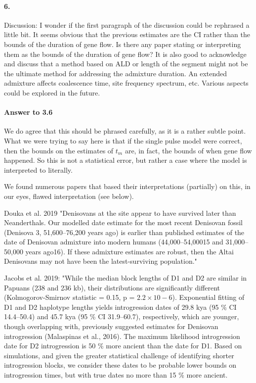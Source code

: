 \documentclass[11pt]{article}
\let\oldparagraph\paragraph
\renewcommand{\paragraph}[1]{\oldparagraph{#1}\mbox{}}
\begin{document}
\paragraph{6.} 
Discussion: I wonder if the first paragraph of the discussion could be rephrased a little bit. It seems obvious that the previous estimates are the CI rather than the bounds of the duration of gene flow. Is there any paper stating or interpreting them as the bounds of the duration of gene flow? It is also good to acknowledge and discuss that a method based on ALD or length of the segment might not be the ultimate method for addressing the admixture duration. An extended admixture affects coalescence time, site frequency spectrum, etc. Various aspects could be explored in the future.

\paragraph{Answer to 3.6}
We do agree that this should be phrased carefully, as it is a rather subtle point. What we were trying to say here is that if the single pulse model were correct, then the bounds on the estimates of $t_m$ are, in fact,  the bounds of when gene flow happened. So this is not a statistical error, but rather a case where the model is interpreted to literally. 

We found numerous papers that based their interpretations (partially) on this, in our eyes, flawed interpretation (see below).

Douka et al. 2019 "Denisovans at the site appear to have survived later than Neanderthals. Our modelled date estimate for the most recent Denisovan fossil (Denisova 3, 51,600–76,200 years ago) is earlier than published estimates of the date of Denisovan admixture into modern humans (44,000–54,00015 and 31,000–50,000 years ago16). If these admixture estimates are robust, then the Altai Denisovans may not have been the latest-surviving population."

Jacobs et al. 2019: "While the median block lengths of D1 and D2 are similar in Papuans (238 and 236 kb), their distributions are significantly different (Kolmogorov-Smirnov statistic = 0.15, p = $2.2 \times 10−6$). Exponential fitting of D1 and D2 haplotype lengths yields introgression dates of 29.8 kya (95 \% CI 14.4–50.4) and 45.7 kya (95 \% CI 31.9–60.7), respectively, which are younger, though overlapping with, previously suggested estimates for Denisovan introgression  (Malaspinas et al., 2016). The maximum likelihood introgression date for D2 introgression is 50 \% more ancient than the date for D1. Based on simulations, and given the greater statistical challenge of identifying shorter introgression blocks, we consider these dates to be probable lower bounds on introgression times, but with true dates no more than 15 \% more ancient.
\end{document}
